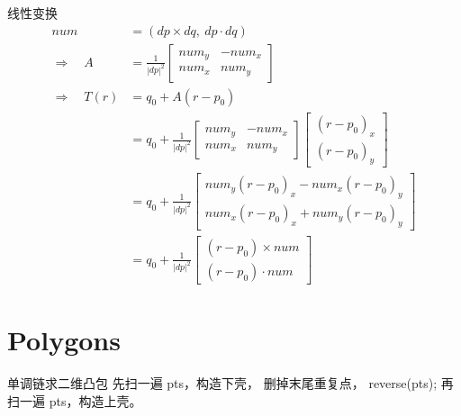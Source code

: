 \begin{lecture}{线性变换}
	\[
	\begin{aligned}
	num &= (dp\times dq,\ dp\cdot dq)\\
	\Rightarrow\quad
	A
	&=
	\frac{1}{|dp|^2}
	\begin{bmatrix}
	num_y & -num_x\\
	num_x & num_y
	\end{bmatrix}
	\\
	\Rightarrow\quad
	T(r)
	&= q_0 + A(r-p_0)\\
	&=
	q_0+
	\frac{1}{|dp|^2}
	\begin{bmatrix}
	num_y & -num_x\\
	num_x & num_y
	\end{bmatrix}
	\begin{bmatrix}
	(r-p_0)_x\\
	(r-p_0)_y
	\end{bmatrix}
	\\
	&=
	q_0+
	\frac{1}{|dp|^2}
	\begin{bmatrix}
	num_y(r-p_0)_x - num_x(r-p_0)_y\\
	num_x(r-p_0)_x + num_y(r-p_0)_y
	\end{bmatrix}
	\\
	&=
	q_0+
	\frac{1}{|dp|^2}
	\begin{bmatrix}
	(r-p_0)\times num\\
	(r-p_0)\cdot num
	\end{bmatrix}
	\end{aligned}
	\]
	\end{lecture}
	


\section{Polygons}
	\begin{lecture}{单调链求二维凸包}
		先扫一遍 pts，构造下壳，  
		删掉末尾重复点，  
		reverse(pts);
		再扫一遍 pts，构造上壳。
	\end{lecture}

